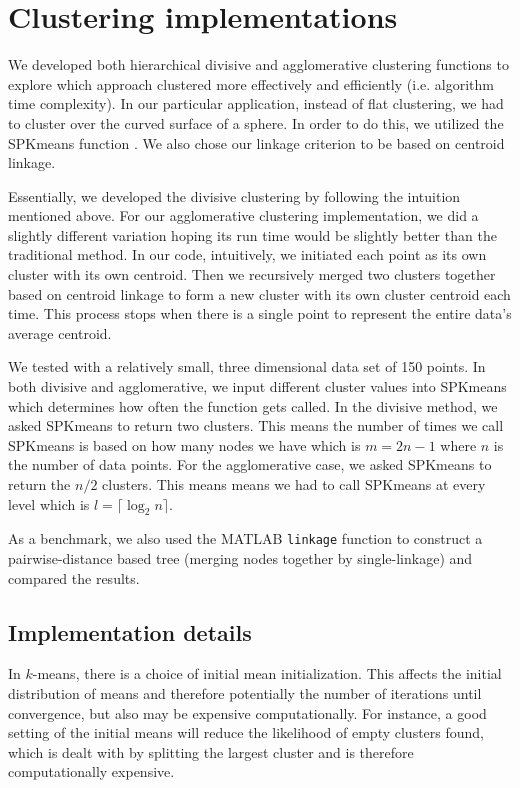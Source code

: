 \documentclass[../tech_report_1.tex]{subfiles}
\begin{document}
\section{Clustering implementations}

We developed both hierarchical divisive and agglomerative clustering
functions to explore which approach clustered more effectively and efficiently (i.e. algorithm time complexity).
In our particular
application, instead of flat clustering, we had to cluster over the
curved surface of a sphere. In order to do this, we utilized the SPKmeans
function \cite{nguyen_spherical_clustering}. We also chose our linkage criterion
to be based on centroid linkage.

Essentially, we developed the divisive clustering by following the
intuition mentioned above. For our agglomerative clustering implementation,
we did a slightly different variation hoping its run time would be
slightly better than the traditional method. In our code, intuitively,
we initiated each point as its own cluster with its own centroid.
Then we recursively merged two clusters together based on centroid
linkage to form a new cluster with its own cluster centroid each time.
This process stops when there is a single point to represent the entire
data's average centroid.

We tested with a relatively small,
three dimensional data set of 150 points. In both 
divisive and agglomerative, we input different cluster values into
SPKmeans which determines how often the function gets called. In the
divisive method, we asked SPKmeans to return two clusters.
This means the number of times we call SPKmeans
is based on how many nodes we have which is $m=2n-1$ where $n$ is
the number of data points. For the agglomerative case, we asked SPKmeans to
return the $n/2$ clusters. This means means we had to call SPKmeans
at every level which is $l=\lceil\log_{2}n\rceil$.


As a benchmark, we also used the MATLAB \texttt{linkage} function to construct a pairwise-distance based tree (merging nodes together by single-linkage) and compared the results.

\subsection{Implementation details}\label{hierarchical_clustering_implementation_details}

In $k$-means, there is a choice of initial mean initialization. This affects the initial distribution of means and therefore potentially the number of iterations until convergence, but also may be expensive computationally. For instance, a good setting of the initial means will reduce the likelihood of empty clusters found, which is dealt with by splitting the largest cluster and is therefore computationally expensive.
\end{document}
